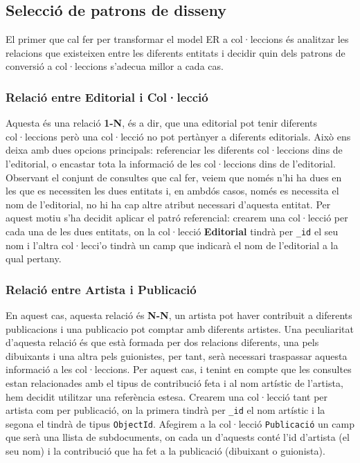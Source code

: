 \documentclass{article}
\begin{document}
\subsection{Selecci\'o de patrons de disseny}
El primer que cal fer per transformar el model ER a col·leccions \'es analitzar les relacions que existeixen entre les diferents entitats i decidir quin dels patrons de conversi\'o a col·leccions s'adecua millor a cada cas.

\subsubsection*{Relaci\'o entre \textbf{Editorial} i \textbf{Col·lecci\'o}}
Aquesta \'es una relaci\'o \textbf{1-N}, \'es a dir, que una editorial pot tenir diferents col·leccions per\`o una col·lecci\'o no pot pert\`anyer a diferents editorials. Aix\`o ens deixa amb dues opcions principals: referenciar les diferents col·leccions dins de l'editorial, o encastar tota la informaci\'o de les col·leccions dins de l'editorial. Observant el conjunt de consultes que cal fer, veiem que nom\'es n'hi ha dues en les que es necessiten les dues entitats i, en ambd\'os casos, nom\'es es necessita el nom de l'editorial, no hi ha cap altre atribut necessari d'aquesta entitat. Per aquest motiu s'ha decidit aplicar el patr\'o referencial: crearem una col·lecci\'o per cada una de les dues entitats, on la col·lecci\'o \textbf{Editorial} tindr\`a per \texttt{_id} el seu nom i l'altra col·lecci'o tindr\`a un camp que indicar\`a el nom de l'editorial a la qual pertany.

\subsubsection*{Relaci\'o entre \textbf{Artista} i \textbf{Publicaci\'o}}
En aquest cas, aquesta relaci\'o \'es \textbf{N-N}, un artista pot haver contribuit a diferents publicacions i una publicacio pot comptar amb diferents artistes. Una peculiaritat d'aquesta relaci\'o \'es que est\`a formada per dos relacions diferents, una pels dibuixants i una altra pels guionistes, per tant, ser\`a necessari traspassar aquesta informaci\'o a les col·leccions. Per aquest cas, i tenint en compte que les consultes estan relacionades amb el tipus de contribuci\'o feta i al nom art\'istic de l'artista, hem decidit utilitzar una refer\`encia estesa. Crearem una col·lecci\'o tant per artista com per publicaci\'o, on la primera tindr\`a per \texttt{_id} el nom art\'istic i la segona el tindr\`a de tipus \texttt{ObjectId}. Afegirem a la col·lecci\'o \texttt{Publicaci\'o} un camp que ser\`a una llista de subdocuments, on cada un d'aquests cont\'e l'id d'artista (el seu nom) i la contribuci\'o que ha fet a la publicaci\'o (dibuixant o guionista).
\end{document}

